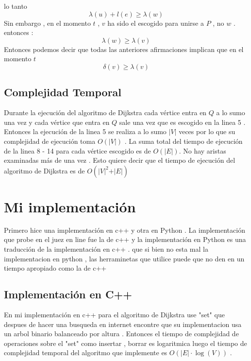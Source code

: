 \documentclass[10pt]{article}
\begin{document}
        lo tanto 
        \begin{equation*}
            \lambda\left(u\right) + l\left(e\right) \geq \lambda\left(w\right)
        \end{equation*} 
        Sin embargo , en el momento $t$ , $v$ ha sido el escogido para unirse a $P$ , no  $w$ . entonces : 
        \begin{equation*}
            \lambda\left(w\right) \geq \lambda\left(v\right)
        \end{equation*}
        Entonces podemos decir que todas las anteriores afirmaciones implican que en el momento $t$ 
        \begin{equation*}
            \delta\left(v\right) \geq \lambda\left(v\right)
        \end{equation*}

    \subsection{Complejidad Temporal }
        \noindent Durante la ejecuci\'on del algoritmo de Dijkstra cada v\'ertice entra en $Q$ a lo sumo una vez y cada v\'ertice que entra en $Q$ sale 
        una vez que es escogido en la linea 5 . Entonces la ejecuci\'on de la linea 5 se realiza a lo sumo $\vert V \vert$ veces por lo que su complejidad 
        de ejecuci\'on toma $O\left(\vert V \vert\right)$ . La suma total del tiempo de ejecuci\'on de la linea 8 - 14 para cada v\'ertice escogido es de $O\left(\vert E \vert\right)$. 
        No hay aristas examinadas m\'as de una vez . Esto quiere decir que el tiempo de ejecuci\'on del algoritmo de Dijkstra es de $O\left(\vert V \vert ^ 2 + \vert E \vert \right)$
        
        
    \section{Mi implementaci\'on}
    \noindent Primero hice una implementaci\'on en c++ y otra en Python . La implementaci\'on que probe en el juez en line fue la de c++ y la implementaci\'on en Python es una traducci\'on de la implementaci\'on
    en c++  . que si bien no esta mal la implementacion en python , las herraminetas que utilice puede que no den en un tiempo apropiado como la de c++   

    \subsection{Implementaci\'on  en C++ } 
    \noindent En mi implementaci\'on en c++ para el algoritmo de Dijkstra use "set" que despues de hacer una busqueda en internet encontre que su implementacion usa 
    un arbol binario balanceado por altura . Entonces el tiempo de complejidad de operaciones sobre el "set" como insertar , borrar es logaritmica luego el tiempo de 
    complejidad temporal del algoritmo que implemente es  $O\left(\vert E \vert \cdot \log \left(V\right)\right)$  .  
\end{document}
